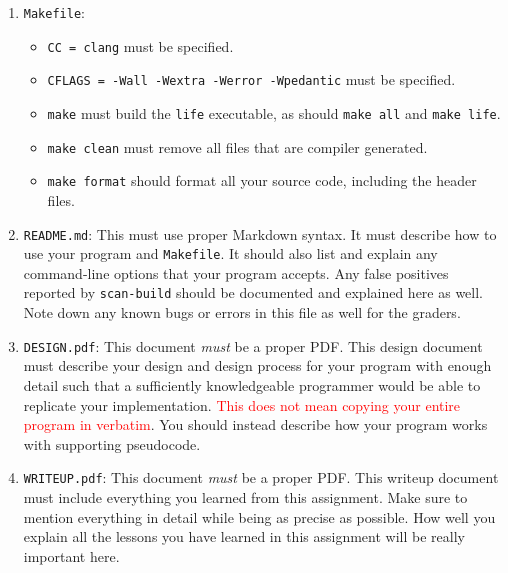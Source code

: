 \begin{enumerate}
  \item \texttt{Makefile}:
    \begin{itemize}
      \item \texttt{CC = clang} must be specified.
      \item \texttt{CFLAGS = -Wall -Wextra -Werror -Wpedantic} must be specified.
      \item \texttt{make} must build the \texttt{life} executable, as should
        \texttt{make all} and \texttt{make life}.
      \item \texttt{make clean} must remove all files that are compiler
        generated.
      \item \texttt{make format} should format all your source code,
        including the header files.
    \end{itemize}
  \item \texttt{README.md}: This must use proper Markdown syntax. It
    must describe how to use your program and \texttt{Makefile}. It
    should also list and explain any command-line options that your
    program accepts. Any false positives reported by \texttt{scan-build}
    should be documented and explained here as well. Note down any known
    bugs or errors in this file as well for the graders.
  \item \texttt{DESIGN.pdf}: This document \emph{must} be a proper
    PDF\@. This design document must describe your design and design
    process for your program with enough detail such that a sufficiently
    knowledgeable programmer would be able to replicate your
    implementation. \textcolor{red}{This does not mean copying your
    entire program in verbatim}. You should instead describe how your
    program works with supporting pseudocode.
  \item \texttt{WRITEUP.pdf}: This document \emph{must} be a proper
    PDF\@. This writeup document must include everything you learned from
    this assignment. Make sure to mention everything in detail while being as precise as possible. How well you explain all the lessons you have learned in this assignment will be really important here. 
\end{enumerate}
